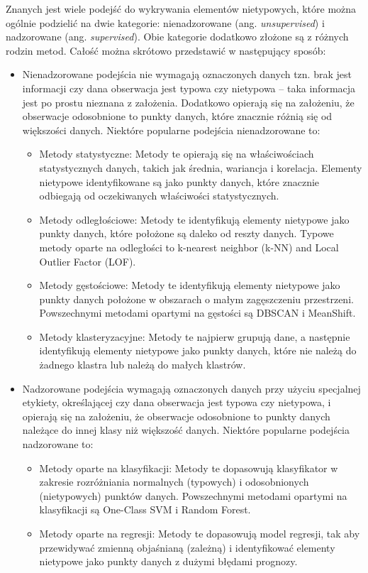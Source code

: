 \documentclass[12pt,a4paper,oneside]{book}
\theoremstyle{definition}
\begin{document}
Znanych jest wiele podejść do wykrywania elementów nietypowych, które można ogólnie podzielić na dwie kategorie: nienadzorowane (ang. \textit{unsupervised}) i nadzorowane (ang. \textit{supervised}). Obie kategorie dodatkowo złożone są z różnych rodzin metod. Całość można skrótowo przedstawić w następujący sposób:
\begin{itemize}
\item Nienadzorowane podejścia nie wymagają oznaczonych danych tzn. brak jest informacji czy dana obserwacja jest typowa czy nietypowa -- taka informacja jest po prostu nieznana z założenia. Dodatkowo opierają się na założeniu, że obserwacje odosobnione to punkty danych, które znacznie różnią się od większości danych. Niektóre popularne podejścia nienadzorowane to:
\begin{itemize}
\item Metody statystyczne: Metody te opierają się na właściwościach statystycznych danych, takich jak średnia, wariancja i korelacja. Elementy nietypowe identyfikowane są jako punkty danych, które znacznie odbiegają od oczekiwanych właściwości statystycznych.
\item Metody odległościowe: Metody te identyfikują elementy nietypowe jako punkty danych, które położone są daleko od reszty danych. Typowe metody oparte na odległości to k-nearest neighbor (k-NN) and Local Outlier Factor (LOF).
\item Metody gęstościowe: Metody te identyfikują elementy nietypowe jako punkty danych położone w obszarach o małym zagęszczeniu przestrzeni. Powszechnymi metodami opartymi na gęstości są DBSCAN i MeanShift.
\item Metody klasteryzacyjne: Metody te najpierw grupują dane, a następnie identyfikują elementy nietypowe jako punkty danych, które nie należą do żadnego klastra lub należą do małych klastrów.
\end{itemize}
\item Nadzorowane podejścia wymagają oznaczonych danych przy użyciu specjalnej etykiety, określającej czy dana obserwacja jest typowa czy nietypowa, i opierają się na założeniu, że obserwacje odosobnione to punkty danych należące do innej klasy niż większość danych. Niektóre popularne podejścia nadzorowane to:
\begin{itemize}
\item Metody oparte na klasyfikacji: Metody te dopasowują klasyfikator w zakresie rozróżniania normalnych (typowych) i odosobnionych (nietypowych) punktów danych. Powszechnymi metodami opartymi na klasyfikacji są One-Class SVM i Random Forest.
\item Metody oparte na regresji: Metody te dopasowują model regresji, tak aby przewidywać zmienną objaśnianą (zależną) i identyfikować elementy nietypowe jako punkty danych z dużymi błędami prognozy.
\end{itemize}
\end{itemize}
\end{document}
